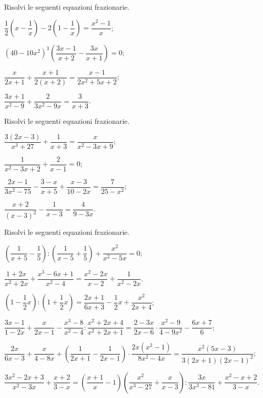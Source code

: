 \begin{esercizio}[\Ast]
\label{ese:20.26}
Risolvi le seguenti equazioni frazionarie.
\begin{multicols}{2}
\begin{enumeratea}
 \item $\dfrac{1}{2} \left(x-\dfrac{1}{x}\right)-2\left(1-\dfrac{1}{x}\right)=\dfrac{x^{2}-1}{x}$;
 \item $\left(40-10x^{2}\right)^{3} \left(\dfrac{3x-1}{x+2}-\dfrac{3x}{x+1}\right)=0$;
 \item $\dfrac{x}{2x+1}+\dfrac{x+1}{2(x+2)}=\dfrac{x-1}{2x^{2}+5x+2}$;
 \item $\dfrac{3x+1}{x^{2}-9}+\dfrac{2}{3x^{2}-9x}=\dfrac{3}{x+3}$.
\end{enumeratea}
\end{multicols}
\end{esercizio}

\begin{esercizio}[\Ast]
\label{ese:20.27}
Risolvi le seguenti equazioni frazionarie.
\begin{multicols}{2}
\begin{enumeratea}
 \item $\dfrac{3(2x-3)}{x^{3}+27}+\dfrac{1}{x+3}=\dfrac{x}{x^{2}-3x+9}$;
 \item $\dfrac{1}{x^{2}-3x+2}+\dfrac{2}{x-1}=0$;
 \item $\dfrac{2x-1}{3x^{2}-75}-\dfrac{3-x}{x+5}+\dfrac{x-3}{10-2x}=\dfrac{7}{25-x^{2}}$;
 \item $\dfrac{x+2}{(x-3)^{2}}-\dfrac{1}{x-3}=\dfrac{4}{9-3x}$.
\end{enumeratea}
\end{multicols}
\end{esercizio}

\begin{esercizio}[\Ast]
\label{ese:20.28}
Risolvi le seguenti equazioni frazionarie.
\begin{enumeratea}
 \item $\left(\dfrac{1}{x+5}-\dfrac{1}{5}\right):\left(\dfrac{1}{x-5}+\dfrac{1}{5}\right)+\dfrac{x^{2}}{x^{2}-5x}=0$;
 \item $\dfrac{1+2x}{x^{2}+2x}+\dfrac{x^{3}-6x+1}{x^{2}-4}=\dfrac{x^{2}-2x}{x-2}+\dfrac{1}{x^{2}-2x}$.
 \item $\left(1-\dfrac{1}{2}x\right):\left(1+\dfrac{1}{2}x\right)=\dfrac{2x+1}{6x+3}-\dfrac{1}{2}x+\dfrac{x^{2}}{2x+4}$;
 \item $\dfrac{3x-1}{1-2x}+\dfrac{x}{2x-1}-\dfrac{x^{3}-8}{x^{2}-4}:\dfrac{x^{2}+2x+4}{x^{2}+2x+1}=\dfrac{2-3x}{2x-6}\cdot {\dfrac{x^{2}-9}{4-9x^{2}}}-\dfrac{6x+7}{6}$;
 \item $\dfrac{2x}{6x-3}+\dfrac{x}{4-8x}+\left(\dfrac{1}{2x+1}-\dfrac{1}{2x-1}\right)\cdot {\dfrac{2x\left(x^{2}-1\right)}{8x^{2}-4x}}=\dfrac{x^{2}(5x-3)}{3(2x+1)(2x-1)^{2}}$;
 \item $\dfrac{3x^{2}-2x+3}{x^{2}-3x}+\dfrac{x+2}{3-x}=\left(\dfrac{x+1}{x}-1\right)\left(\dfrac{x^{2}}{x^{3}-27}+\dfrac{x}{x-3}\right):\dfrac{3x}{3x^{3}-81}+\dfrac{x^{2}-x+2}{3-x}$.
\end{enumeratea}
\end{esercizio}

